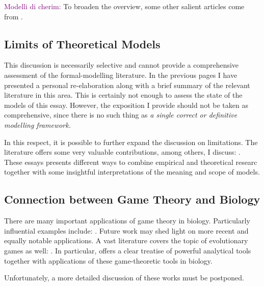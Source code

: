 \vspace*{1em}
\textcolor{purple}{Modelli di cherim:} To broaden the overview, some other salient articles come from
\textcite{Kirshner01092000, wagnerBargainingWar2000, wittmanHowWarEnds1979, smithBargainingNatureWar2004, filsonBargainingFightingImpact2004}.

\subsection{Limits of Theoretical Models}
This discussion is necessarily selective and cannot provide a comprehensive assessment of the formal-modelling literature. In the previous pages I have presented a personal re-elaboration along with a brief summary of the relevant literature in this area. This is certainly not enough to assess the state of the models of this essay. However, the exposition I provide should not be taken as comprehensive, since there is no such thing as \textit{a single correct or definitive modelling framework.}

In this respect, it is possible to further expand the discussion on limitations. The literature offers some very valuable contributions, among others, I discuss:
\textcite{ashworthTheoryCredibilityIntegrating2021, brauningerTheoryBuildingCausal2020, alma991001906059707991}. These essays presents different ways to combine empirical and theoretical researc together with some insightful interpretations of the meaning and scope of models.

\subsection{Connection between Game Theory and Biology}
There are many important applications of game theory in biology. Particularly influential examples include: \textcite{smithLogicAnimalConflict1973, axelrodEvolutionCooperation1981}.
Future work may shed light on more recent and equally notable applications.
A vast literature covers the topic of evolutionary games as well: \textcite{kandoriLearningMutationLong1993, taylorEvolutionaryStableStrategies1978, hofbauerEvolutionaryGamesPopulation2003, nowakFiveRulesEvolution2006}. In particular, \textcite[chap 12]{hofbauerEvolutionaryGamesPopulation2003} offers a clear treatise of powerful analytical tools together with applications of these game-theoretic tools in biology.

Unfortunately, a more detailed discussion of these works must be postponed.